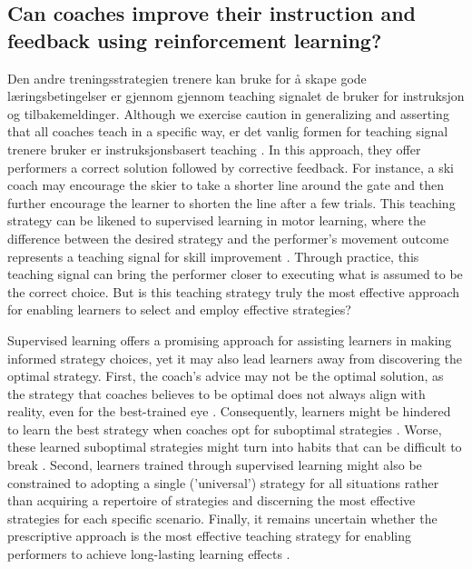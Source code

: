 \subsection{Can coaches improve their instruction and feedback using reinforcement learning?}
Den andre treningsstrategien trenere kan bruke for å skape gode læringsbetingelser er gjennom gjennom teaching signalet de bruker for instruksjon og tilbakemeldinger. Although we exercise caution in generalizing and asserting that all coaches teach in a specific way, er det vanlig formen for teaching signal trenere bruker er instruksjonsbasert teaching \cite{williams_practice_2005, williams_effective_2023, hodges_modelling_2002}. In this approach, they offer performers a correct solution followed by corrective feedback. For instance, a ski coach may encourage the skier to take a shorter line around the gate and then further encourage the learner to shorten the line after a few trials. This teaching strategy can be likened to supervised learning in motor learning, where the difference between the desired strategy and the performer's movement outcome represents a teaching signal for skill improvement  \cite{jordan_forward_1992, wolpert_motor_2010, doya_complementary_2000}. Through practice, this teaching signal can bring the performer closer to executing what is assumed to be the correct choice. But is this teaching strategy truly the most effective approach for enabling learners to select and employ effective strategies? 

Supervised learning offers a promising approach for assisting learners in making informed strategy choices, yet it may also lead learners away from discovering the optimal strategy. First, the coach's advice may not be the optimal solution, as the strategy that coaches believes to be optimal does not always align with reality, even for the best-trained eye \cite{supej_impact_2019, cochrum_visual_2021}. Consequently, learners might be hindered to learn the best strategy when coaches opt for suboptimal strategies \cite{gray_plateaus_2017}. Worse, these learned suboptimal strategies might turn into habits that can be difficult to break \cite{popp_effect_2020}. Second, learners trained through supervised learning might also be constrained to adopting a single ('universal') strategy for all situations rather than acquiring a repertoire of strategies and discerning the most effective strategies for each specific scenario. Finally, it remains uncertain whether the prescriptive approach is the most effective teaching strategy for enabling performers to achieve long-lasting learning effects \cite{wulf_instructions_1997, hodges_role_1999, williams_practice_2005,williams_effective_2023}. 

